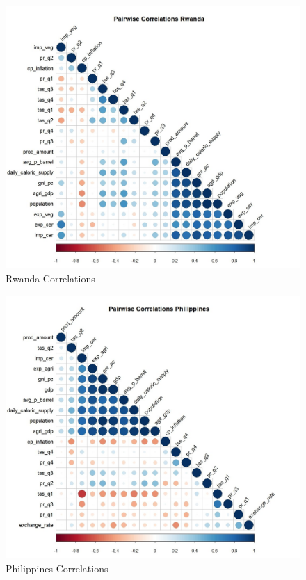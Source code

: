 \documentclass[11pt]{article}
\begin{document}
\FloatBarrier
\begin{figure}[!htb]
\begin{center}
\includegraphics[scale=0.5]{R2.jpg}
\caption{Rwanda Correlations}
\label{figure7}
\end{center}
\end{figure}
\FloatBarrier

\FloatBarrier
\begin{figure}[!htb]
\begin{center}
\includegraphics[scale=0.5]{R3.jpg}
\caption{Philippines Correlations}
\label{figure8}
\end{center}
\end{figure}
\FloatBarrier
\end{document}
